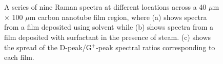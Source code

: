 \documentclass[
  a4paper,
]{scrbook}
\begin{document}
\begin{figure}
\begin{minipage}[t]{0.47\linewidth}
{{}

}

\subcaption{\label{fig-surfactant-deposited}}
\end{minipage}%
\newline
\begin{minipage}[t]{0.33\linewidth}

{\centering 

~

}

\end{minipage}%
%
\begin{minipage}[t]{0.35\linewidth}

{\centering 


}

\subcaption{\label{fig-dg-peak-comparison}}
\end{minipage}%
%
\begin{minipage}[t]{0.33\linewidth}

{\centering 

~

}

\end{minipage}%

\caption{\label{fig-pristine-raman}A series of nine Raman spectra at
different locations across a 40 \(\mu\)m \(\times\) 100 \(\mu\)m carbon
nanotube film region, where (a) shows spectra from a film deposited
using solvent while (b) shows spectra from a film deposited with
surfactant in the presence of steam. (c) shows the spread of the
D-peak/G\(^+\)-peak spectral ratios corresponding to each film.}

\end{figure}
\end{document}
